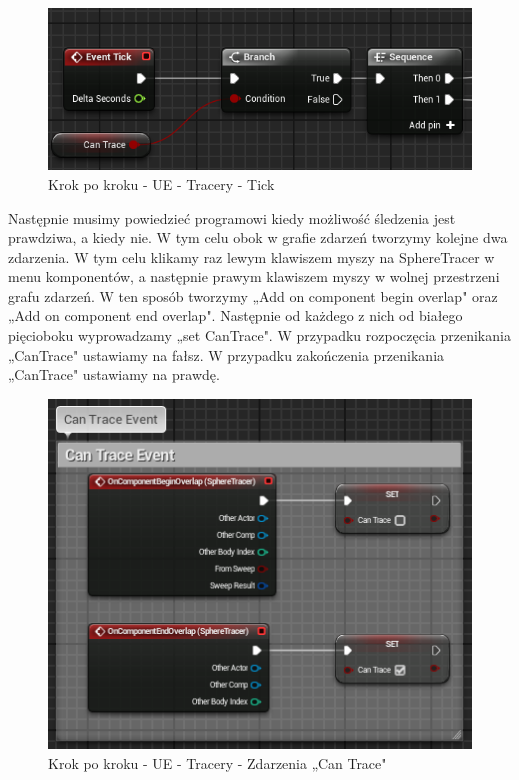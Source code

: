 \documentclass[12pt]{xmgr}
\begin{document}
\begin{figure}[!htb]
    \begin{center}
    \includegraphics[scale=0.5]{Screeny/UeKrokPoKroku/UE-Tick}
    \end{center}
    \caption{Krok po kroku - UE - Tracery - Tick}
\end{figure}

Następnie musimy powiedzieć programowi kiedy możliwość śledzenia jest prawdziwa, a kiedy nie. W tym celu obok w grafie zdarzeń tworzymy kolejne dwa zdarzenia. W tym celu klikamy raz lewym klawiszem myszy na SphereTracer w menu komponentów, a następnie prawym klawiszem myszy w wolnej przestrzeni grafu zdarzeń. W ten sposób tworzymy „Add on component begin overlap" oraz „Add on component end overlap". Następnie od każdego z nich od białego pięcioboku wyprowadzamy „set CanTrace". W przypadku rozpoczęcia przenikania „CanTrace" ustawiamy na fałsz. W przypadku zakończenia przenikania „CanTrace" ustawiamy na prawdę.
\newpage
\begin{figure}[!htb]
    \begin{center}
    \includegraphics[scale=0.5]{Screeny/UeKrokPoKroku/UE-canTrace}
    \end{center}
    \caption{Krok po kroku - UE - Tracery - Zdarzenia „Can Trace"}
\end{figure}
\end{document}
